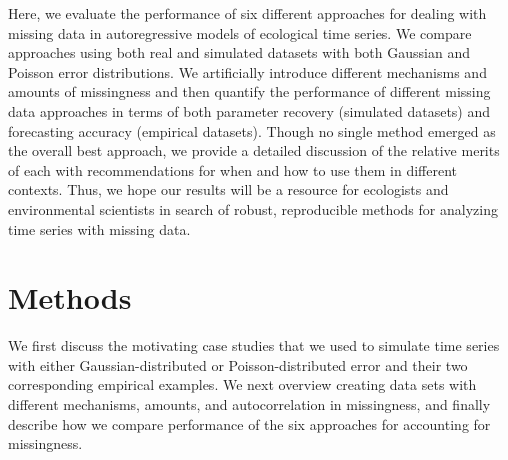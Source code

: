 \documentclass[12pt,english]{article} %
\begin{document}
\begin{linenumbers}
\begin{spacing}{1.9}
\begin{flushleft}
\hspace{1em} Here, we evaluate the performance of six different approaches for dealing with missing data in autoregressive models of ecological time series. We compare approaches using both real and simulated datasets with both Gaussian and Poisson error distributions. We artificially introduce different mechanisms and amounts of missingness and then quantify the performance of different missing data approaches in terms of both parameter recovery (simulated datasets) and forecasting accuracy (empirical datasets). Though no single method emerged as the overall best approach, we provide a detailed discussion of the relative merits of each with recommendations for when and how to use them in different contexts. Thus, we hope our results will be a resource for ecologists and environmental scientists in search of robust, reproducible methods for analyzing time series with missing data.

\vspace{-2.5em}
\section*{Methods} 
\vspace{-1.5em}


We first discuss the motivating case studies that we used to simulate time series with either Gaussian-distributed or Poisson-distributed error and their two corresponding empirical examples. We next overview creating data sets with different mechanisms, amounts, and autocorrelation in missingness, and finally describe how we compare performance of the six approaches for accounting for missingness.%


\end{flushleft}
\end{spacing}
\end{linenumbers}
\end{document}
